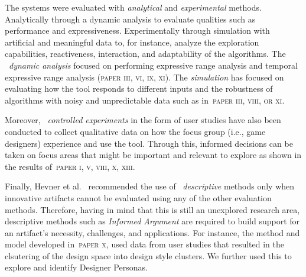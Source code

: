 The systems were evaluated with \emph{analytical} and \emph{experimental} methods. Analytically through a dynamic analysis to evaluate qualities such as performance and expressiveness. Experimentally through simulation with artificial and meaningful data to, for instance, analyze the exploration capabilities, reactiveness, interaction, and adaptability of the algorithms. The ~\emph{dynamic analysis} focused on performing expressive range analysis and temporal expressive range analysis (\textsc{paper iii, vi, ix, xi}). The \emph{simulation} has focused on evaluating how the tool responds to different inputs and the robustness of algorithms with noisy and unpredictable data such as in~\textsc{paper iii, viii, or xi}.

Moreover, ~\emph{controlled experiments} in the form of user studies have also been conducted to collect qualitative data on how the focus group (i.e., game designers) experience and use the tool. Through this, informed decisions can be taken on focus areas that might be important and relevant to explore as shown in the results of~\textsc{paper i, v, viii, x, xiii}. 


Finally, Hevner et al.~\cite{DSRM-Hevner} recommended the use of ~\emph{descriptive} methods only when innovative artifacts cannot be evaluated using any of the other evaluation methods. Therefore, having in mind that this is still an unexplored research area, descriptive methods such as \emph{Informed Argument} are required to build support for an artifact's necessity, challenges, and applications. For instance, the method and model developed in~\textsc{paper x}, used data from user studies that resulted in the clsutering of the design space into design style clusters. We further used this to explore and identify Designer Personas.







